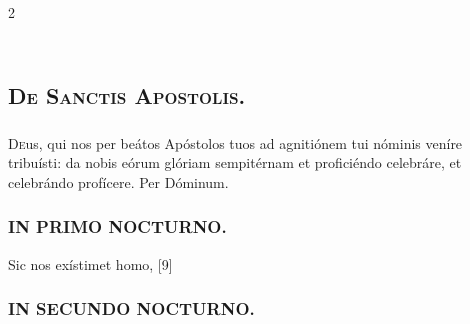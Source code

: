 \documentclass[9pt,twoside]{extarticle}
\begin{document}
\begin{multicols}{2}
\subsection*{\center {}}
\subsection*{\center \textsc{\\ De Sanctis Apostolis.}}
\subsubsection*{\center {}}

\begin{tightlist}{}
\item {}
\end{tightlist}

\subsubsection*{\center {}}
\lettrine{D}eus, qui nos per beátos Apóstolos tuos ad agnitiónem tui nóminis veníre tribuísti: da nobis eórum glóriam sempitérnam et proficiéndo celebráre, et celebrándo profícere. Per Dóminum.

\subsubsection*{\center \textsc{IN PRIMO NOCTURNO.}}
\begin{tightlist}{}
\item {} Sic nos exístimet homo,  [9]
\end{tightlist}

\subsubsection*{\center \textsc{IN SECUNDO NOCTURNO.}}


\end{multicols}
\end{document}
